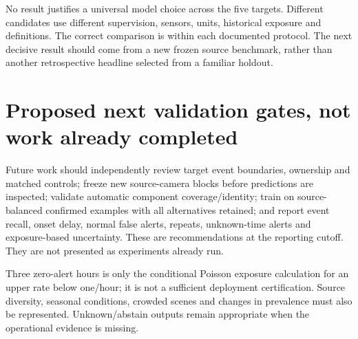 No result justifies a universal model choice across the five targets. Different candidates use different supervision, sensors, units, historical exposure and definitions. The correct comparison is within each documented protocol. The next decisive result should come from a new frozen source benchmark, rather than another retrospective headline selected from a familiar holdout.

\section{Proposed next validation gates, not work already completed}
Future work should independently review target event boundaries, ownership and matched controls; freeze new source-camera blocks before predictions are inspected; validate automatic component coverage/identity; train on source-balanced confirmed examples with all alternatives retained; and report event recall, onset delay, normal false alerts, repeats, unknown-time alerts and exposure-based uncertainty. These are recommendations at the reporting cutoff. They are not presented as experiments already run.

Three zero-alert hours is only the conditional Poisson exposure calculation for an upper rate below one/hour; it is not a sufficient deployment certification. Source diversity, seasonal conditions, crowded scenes and changes in prevalence must also be represented. Unknown/abstain outputs remain appropriate when the operational evidence is missing.
